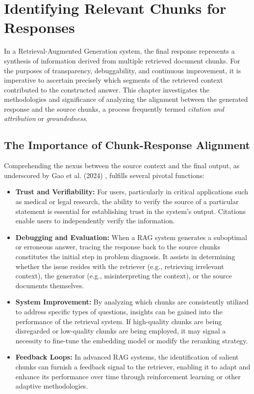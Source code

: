 \chapter{Identifying Relevant Chunks for Responses}
\label{chap:relevant_chunks}

In a Retrieval-Augmented Generation system, the final response represents a synthesis of information derived from multiple retrieved document chunks. For the purposes of transparency, debuggability, and continuous improvement, it is imperative to ascertain precisely which segments of the retrieved context contributed to the constructed answer. This chapter investigates the methodologies and significance of analyzing the alignment between the generated response and the source chunks, a process frequently termed \textit{citation and attribution} or \textit{groundedness}.

\section{The Importance of Chunk-Response Alignment}
Comprehending the nexus between the source context and the final output, as underscored by Gao et al. (2024) \autocite{gao2024retrievalaugmented}, fulfills several pivotal functions:
\begin{itemize}
    \item \textbf{Trust and Verifiability:} For users, particularly in critical applications such as medical or legal research, the ability to verify the source of a particular statement is essential for establishing trust in the system's output. Citations enable users to independently verify the information.
    \item \textbf{Debugging and Evaluation:} When a RAG system generates a suboptimal or erroneous answer, tracing the response back to the source chunks constitutes the initial step in problem diagnosis. It assists in determining whether the issue resides with the retriever (e.g., retrieving irrelevant context), the generator (e.g., misinterpreting the context), or the source documents themselves.
    \item \textbf{System Improvement:} By analyzing which chunks are consistently utilized to address specific types of questions, insights can be gained into the performance of the retrieval system. If high-quality chunks are being disregarded or low-quality chunks are being employed, it may signal a necessity to fine-tune the embedding model or modify the reranking strategy.
    \item \textbf{Feedback Loops:} In advanced RAG systems, the identification of salient chunks can furnish a feedback signal to the retriever, enabling it to adapt and enhance its performance over time through reinforcement learning or other adaptive methodologies.
\end{itemize}

